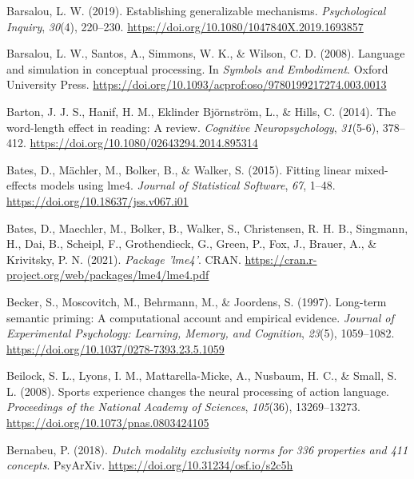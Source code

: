\documentclass[
  12pt,
  man,floatsintext]{apa7}
\newlength{\cslhangindent}
\newlength{\cslentryspacingunit} %
\newenvironment{CSLReferences}[2] %
 {%
  \setlength{\parindent}{0pt}
  \ifodd #1
  \let\oldpar\par
  \def\par{\hangindent=\cslhangindent\oldpar}
  \fi
  \setlength{\parskip}{#2\cslentryspacingunit}
 }%
 {}
\begin{document}
\begin{CSLReferences}{1}{0}
\leavevmode{}%
Barsalou, L. W. (2019). Establishing generalizable mechanisms. \emph{Psychological Inquiry}, \emph{30}(4), 220--230. \url{https://doi.org/10.1080/1047840X.2019.1693857}

\leavevmode{}%
Barsalou, L. W., Santos, A., Simmons, W. K., \& Wilson, C. D. (2008). Language and simulation in conceptual processing. In \emph{Symbols and {Embodiment}}. {Oxford University Press}. \url{https://doi.org/10.1093/acprof:oso/9780199217274.003.0013}

\leavevmode{}%
Barton, J. J. S., Hanif, H. M., Eklinder Björnström, L., \& Hills, C. (2014). The word-length effect in reading: {A} review. \emph{Cognitive Neuropsychology}, \emph{31}(5-6), 378--412. \url{https://doi.org/10.1080/02643294.2014.895314}

\leavevmode{}%
Bates, D., Mächler, M., Bolker, B., \& Walker, S. (2015). Fitting linear mixed-effects models using {lme4}. \emph{Journal of Statistical Software}, \emph{67}, 1--48. \url{https://doi.org/10.18637/jss.v067.i01}

\leavevmode{}%
Bates, D., Maechler, M., Bolker, B., Walker, S., Christensen, R. H. B., Singmann, H., Dai, B., Scheipl, F., Grothendieck, G., Green, P., Fox, J., Brauer, A., \& Krivitsky, P. N. (2021). \emph{Package '{lme4}'}. {CRAN}. \url{https://cran.r-project.org/web/packages/lme4/lme4.pdf}

\leavevmode{}%
Becker, S., Moscovitch, M., Behrmann, M., \& Joordens, S. (1997). Long-term semantic priming: {A} computational account and empirical evidence. \emph{Journal of Experimental Psychology: Learning, Memory, and Cognition}, \emph{23}(5), 1059--1082. \url{https://doi.org/10.1037/0278-7393.23.5.1059}

\leavevmode{}%
Beilock, S. L., Lyons, I. M., Mattarella-Micke, A., Nusbaum, H. C., \& Small, S. L. (2008). Sports experience changes the neural processing of action language. \emph{Proceedings of the National Academy of Sciences}, \emph{105}(36), 13269--13273. \url{https://doi.org/10.1073/pnas.0803424105}

\leavevmode{}%
Bernabeu, P. (2018). \emph{Dutch modality exclusivity norms for 336 properties and 411 concepts}. {PsyArXiv}. \url{https://doi.org/10.31234/osf.io/s2c5h}


\end{CSLReferences}
\end{document}
